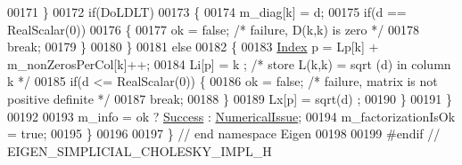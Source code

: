 \begin{DoxyCode}
00171     \}
00172     \textcolor{keywordflow}{if}(DoLDLT)
00173     \{
00174       m\_diag[k] = d;
00175       \textcolor{keywordflow}{if}(d == RealScalar(0))
00176       \{
00177         ok = \textcolor{keyword}{false};                         \textcolor{comment}{/* failure, D(k,k) is zero */}
00178         \textcolor{keywordflow}{break};
00179       \}
00180     \}
00181     \textcolor{keywordflow}{else}
00182     \{
00183       \hyperlink{namespace_eigen_a62e77e0933482dafde8fe197d9a2cfde}{Index} p = Lp[k] + m\_nonZerosPerCol[k]++;
00184       Li[p] = k ;                \textcolor{comment}{/* store L(k,k) = sqrt (d) in column k */}
00185       \textcolor{keywordflow}{if}(d <= RealScalar(0)) \{
00186         ok = \textcolor{keyword}{false};              \textcolor{comment}{/* failure, matrix is not positive definite */}
00187         \textcolor{keywordflow}{break};
00188       \}
00189       Lx[p] = sqrt(d) ;
00190     \}
00191   \}
00192 
00193   m\_info = ok ? \hyperlink{group__enums_gga85fad7b87587764e5cf6b513a9e0ee5ea52581b035f4b59c203b8ff999ef5fcea}{Success} : \hyperlink{group__enums_gga85fad7b87587764e5cf6b513a9e0ee5eaaf9b736d310a664e7729d163a035cc5f}{NumericalIssue};
00194   m\_factorizationIsOk = \textcolor{keyword}{true};
00195 \}
00196 
00197 \} \textcolor{comment}{// end namespace Eigen}
00198 
00199 \textcolor{preprocessor}{#endif // EIGEN\_SIMPLICIAL\_CHOLESKY\_IMPL\_H}
\end{DoxyCode}
